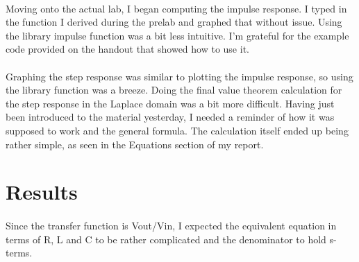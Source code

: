 \documentclass[12pt]{report}
\begin{document}
    \paragraph{} Moving onto the actual lab, I began computing the impulse response. I typed in the function I derived during the prelab and graphed that without issue. Using the library impulse function was a bit less intuitive. I'm grateful for the example code provided on the handout that showed how to use it. 
    
    \paragraph{} Graphing the step response was similar to plotting the impulse response, so using the library function was a breeze. Doing the final value theorem calculation for the step response in the Laplace domain was a bit more difficult. Having just been introduced to the material yesterday, I needed a reminder of how it was supposed to work and the general formula. The calculation itself ended up being rather simple, as seen in the Equations section of my report. 
    
\section{Results}


    \paragraph{} Since the transfer function is Vout/Vin, I expected the equivalent equation in terms of R, L and C to be rather complicated and the denominator to hold s-terms.
    
\end{document}
